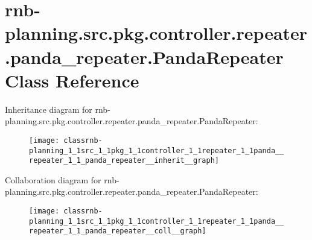 \hypertarget{classrnb-planning_1_1src_1_1pkg_1_1controller_1_1repeater_1_1panda__repeater_1_1_panda_repeater}{}\section{rnb-\/planning.src.\+pkg.\+controller.\+repeater.\+panda\+\_\+repeater.\+Panda\+Repeater Class Reference}
\label{classrnb-planning_1_1src_1_1pkg_1_1controller_1_1repeater_1_1panda__repeater_1_1_panda_repeater}


Inheritance diagram for rnb-\/planning.src.\+pkg.\+controller.\+repeater.\+panda\+\_\+repeater.\+Panda\+Repeater\+:
\nopagebreak
\begin{figure}[H]
\begin{center}
\leavevmode
\texttt{[image: classrnb-planning\_1\_1src\_1\_1pkg\_1\_1controller\_1\_1repeater\_1\_1panda\_\_repeater\_1\_1\_panda\_repeater\_\_inherit\_\_graph]}
\end{center}
\end{figure}


Collaboration diagram for rnb-\/planning.src.\+pkg.\+controller.\+repeater.\+panda\+\_\+repeater.\+Panda\+Repeater\+:
\nopagebreak
\begin{figure}[H]
\begin{center}
\leavevmode
\texttt{[image: classrnb-planning\_1\_1src\_1\_1pkg\_1\_1controller\_1\_1repeater\_1\_1panda\_\_repeater\_1\_1\_panda\_repeater\_\_coll\_\_graph]}
\end{center}
\end{figure}
